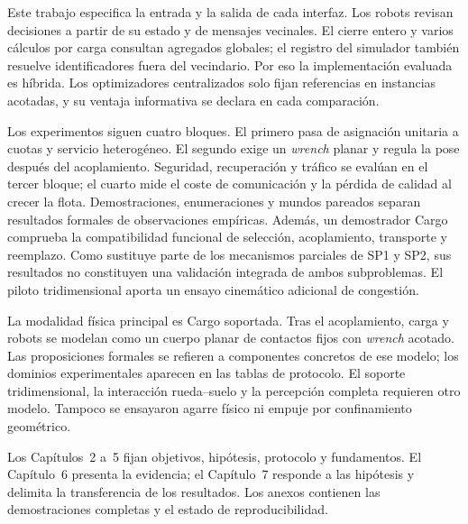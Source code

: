 Este trabajo especifica la entrada y la salida de cada interfaz. Los robots
revisan decisiones a partir de su estado y de mensajes vecinales. El cierre
entero y varios cálculos por carga consultan agregados globales; el registro del
simulador también resuelve identificadores fuera del vecindario. Por eso la
implementación evaluada es híbrida. Los optimizadores centralizados solo fijan
referencias en instancias acotadas, y su ventaja informativa se declara en cada
comparación.

Los experimentos siguen cuatro bloques. El primero pasa de asignación unitaria a
cuotas y servicio heterogéneo. El segundo exige un \emph{wrench} planar y regula
la pose después del acoplamiento. Seguridad, recuperación y tráfico se evalúan
en el tercer bloque; el cuarto mide el coste de comunicación y la pérdida de
calidad al crecer la flota. Demostraciones, enumeraciones y mundos pareados
separan resultados formales de observaciones empíricas. Además, un demostrador
Cargo comprueba la compatibilidad funcional de selección, acoplamiento,
transporte y reemplazo. Como sustituye parte de los mecanismos parciales de SP1
y SP2, sus resultados no constituyen una validación integrada de ambos
subproblemas. El
piloto tridimensional aporta un ensayo cinemático adicional de congestión.

La modalidad física principal es Cargo soportada. Tras el acoplamiento, carga y
robots se modelan como un cuerpo planar de contactos fijos con \emph{wrench}
acotado. Las proposiciones formales se refieren a componentes concretos de ese
modelo; los dominios experimentales aparecen en las tablas de protocolo. El
soporte tridimensional, la interacción rueda--suelo y la percepción completa
requieren otro modelo. Tampoco se ensayaron agarre físico ni empuje por
confinamiento geométrico.

Los Capítulos~2 a~5 fijan objetivos, hipótesis, protocolo y fundamentos. El
Capítulo~6 presenta la evidencia; el Capítulo~7 responde a las hipótesis y
delimita la transferencia de los resultados. Los anexos contienen las
demostraciones completas y el estado de reproducibilidad.
